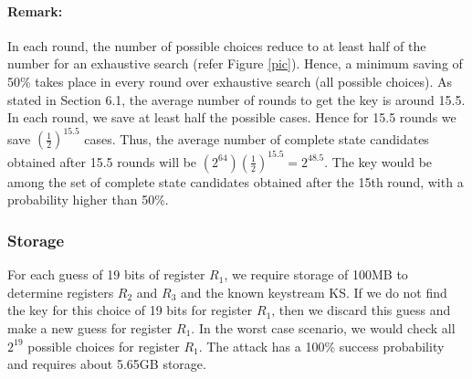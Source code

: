\documentclass{llncs}
\begin{document}
\paragraph{Remark:}
In each round, the number of possible choices reduce to at least half of the number for an exhaustive search (refer Figure \ref{pic}). Hence, a minimum saving of 50\% takes place in every round over exhaustive search (all possible choices). As stated in Section 6.1, the average number of rounds to get the key is around 15.5. In each round, we save at least half the possible cases. Hence for 15.5 rounds we save $(\frac{1}{2})^{15.5}$ cases. Thus, the average number of complete state candidates obtained after 15.5 rounds will be $(2^{64})(\frac{1}{2})^{15.5} = 2^{48.5}$. The key would be among the set of complete state candidates obtained after the 15th round, with a probability higher than 50\%.
\subsubsection{Storage} 
For each guess of 19 bits of register $R_1$, we require storage of 100MB to determine registers $R_2$ and $R_3$ and the known keystream KS. If we do not find the key for this choice of 19 bits for register $R_1$, then we discard this guess and make a new guess for register $R_1$. In the worst case scenario, we would check all $2^{19}$ possible choices for register $R_1$. The attack has a 100\% success probability and requires about 5.65GB storage.
\end{document}
